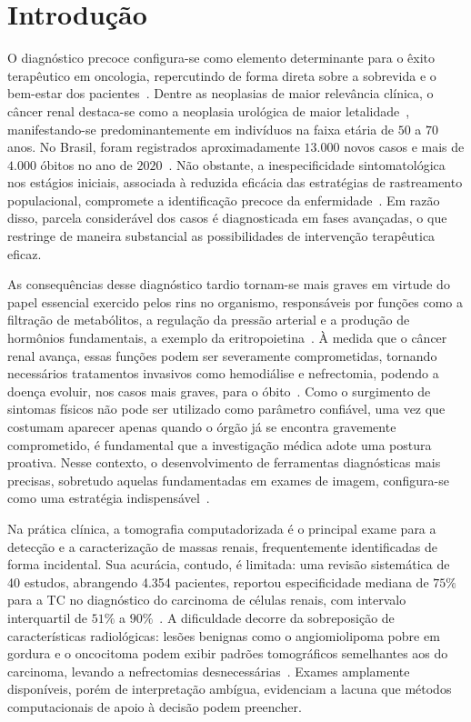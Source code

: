 \documentclass[conference]{IEEEtran}
\begin{document}
\section{Introdução}

O diagnóstico precoce configura-se como elemento determinante para o êxito
terapêutico em oncologia, repercutindo de forma direta sobre a sobrevida e
o bem-estar dos pacientes~\cite{gomes2025}. Dentre as neoplasias de maior
relevância clínica, o câncer renal destaca-se como a neoplasia urológica de
maior letalidade~\cite{santos2025}, manifestando-se predominantemente em
indivíduos na faixa etária de $50$ a $70$ anos. No Brasil, foram registrados
aproximadamente $13.000$ novos casos e mais de $4.000$ óbitos no ano de
$2020$~\cite{inca2022}. Não obstante, a inespecificidade sintomatológica nos
estágios iniciais, associada à reduzida eficácia das estratégias de
rastreamento populacional, compromete a identificação precoce da
enfermidade~\cite{campbell2021}. Em razão disso, parcela considerável dos
casos é diagnosticada em fases avançadas, o que restringe de maneira
substancial as possibilidades de intervenção terapêutica eficaz.

As consequências desse diagnóstico tardio tornam-se mais graves em virtude do
papel essencial exercido pelos rins no organismo, responsáveis por funções
como a filtração de metabólitos, a regulação da pressão arterial e a produção
de hormônios fundamentais, a exemplo da eritropoietina~\cite{hall}. À medida
que o câncer renal avança, essas funções podem ser severamente comprometidas,
tornando necessários tratamentos invasivos como hemodiálise e nefrectomia,
podendo a doença evoluir, nos casos mais graves, para o óbito~\cite{inca2022}. Como o
surgimento de sintomas físicos não pode ser utilizado como parâmetro
confiável, uma vez que costumam aparecer apenas quando o órgão já se encontra
gravemente comprometido, é fundamental que a investigação médica adote uma
postura proativa. Nesse contexto, o desenvolvimento de ferramentas
diagnósticas mais precisas, sobretudo aquelas fundamentadas em exames de
imagem, configura-se como uma estratégia indispensável~\cite{bakas}.

Na prática clínica, a tomografia computadorizada é o principal exame para a
detecção e a caracterização de massas renais, frequentemente identificadas de
forma incidental. Sua acurácia, contudo, é limitada: uma revisão sistemática de
40 estudos, abrangendo 4.354 pacientes, reportou especificidade mediana de
$75\%$ para a TC no diagnóstico do carcinoma de células renais, com intervalo
interquartil de $51\%$ a $90\%$~\cite{vogel2019}. A dificuldade decorre da
sobreposição de características radiológicas: lesões benignas como o
angiomiolipoma pobre em gordura e o oncocitoma podem exibir padrões
tomográficos semelhantes aos do carcinoma, levando a nefrectomias
desnecessárias~\cite{klontzas2024}. Exames amplamente disponíveis, porém de
interpretação ambígua, evidenciam a lacuna que métodos computacionais de apoio
à decisão podem preencher.
\end{document}
